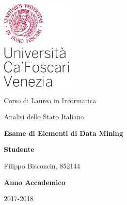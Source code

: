 \thispagestyle{empty}
\vspace*{-1.5cm}

\includegraphics[height=4.5cm]{images/unive.pdf}

\begin{center}

\vspace*{1.0cm}

\LARGE
Corso di Laurea in Informatica

\vspace*{2.0cm}

Analisi dello Stato Italiano

\vspace*{1.0cm}

\begin{large}
\textbf{Esame di Elementi di Data Mining}
\end{large}

\end{center}

\vspace*{2.5cm}

\begin{flushleft}

\textbf{Studente}

Filippo Bisconcin, 852144

\vspace*{1.0cm}

\textbf{Anno Accademico}

2017-2018
\end{flushleft}
